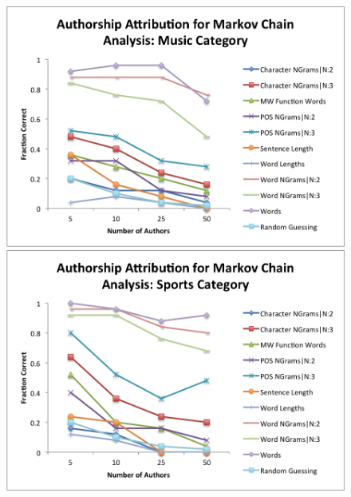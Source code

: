 \documentclass[pageno]{jpaper}
\begin{document}
\begin{figure}[h!]
\begin{center}
\includegraphics*[scale=.75]{MarkovMusic}
\includegraphics*[scale=.75]{MarkovSports}
\end{center}
\label{fig:MarkovCategories2}
\end{figure}
\end{document}
